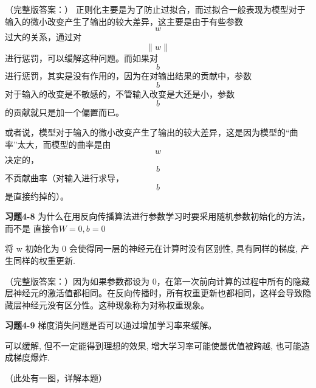 （完整版答案：）
正则化主要是为了防止过拟合，而过拟合一般表现为模型对于输入的微小改变产生了输出的较大差异，这主要是由于有些参数 $$w$$ 过大的关系，通过对 $$\|w\|$$ 进行惩罚，可以缓解这种问题。而如果对 $$b$$ 进行惩罚，其实是没有作用的，因为在对输出结果的贡献中，参数 $$b$$ 对于输入的改变是不敏感的，不管输入改变是大还是小，参数 $$b$$ 的贡献就只是加一个偏置而已。

或者说，模型对于输入的微小改变产生了输出的较大差异，这是因为模型的“曲率”太大，而模型的曲率是由 $$w$$ 决定的，$$b$$ 不贡献曲率（对输入进行求导，$$b$$ 是直接约掉的）。

\noindent\textbf{习题4-8} 为什么在用反向传播算法进行参数学习时要采用随机参数初始化的方法，而不是
直接令$W=0,b=0$

将 w​ 初始化为 0 会使得同一层的神经元在计算时没有区别性, 具有同样的梯度, 产生同样的权重更新.

（完整版答案：）因为如果参数都设为 0，在第一次前向计算的过程中所有的隐藏层神经元的激活值都相同。在反向传播时，所有权重更新也都相同，这样会导致隐藏层神经元没有区分性。这种现象称为对称权重现象。

\noindent\textbf{习题4-9} 梯度消失问题是否可以通过增加学习率来缓解。

可以缓解, 但不一定能得到理想的效果, 增大学习率可能使最优值被跨越, 也可能造成梯度爆炸.

（此处有一图，详解本题）

